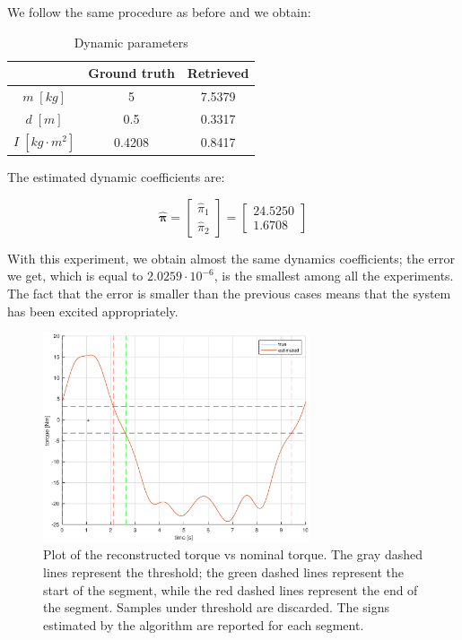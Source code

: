 \documentclass{article}
\begin{document}
We follow the same procedure as before and we obtain:

\begin{table}[!htbp]
\centering
\begin{tabular}{|c|cc|}
\hline
& Ground truth & Retrieved\\
\hline
$m\;[kg]$ & 5 & 7.5379\\ 
$d\;[m]$ & 0.5 & 0.3317\\
$I\;[kg\cdot m^2]$ & 0.4208 & 0.8417\\
\hline
\end{tabular}
\caption{Dynamic parameters}
\end{table}
\FloatBarrier

The estimated dynamic coefficients are:

\[\bm{\hat{\pi}}= \begin{bmatrix}
\hat{\pi}_1 \\\hat{ \pi}_2
\end{bmatrix} =
\begin{bmatrix}
24.5250 \\ 1.6708
\end{bmatrix}\]

With this experiment, we obtain almost the same dynamics coefficients; the error we get, which is equal to $2.0259\cdot10^{-6}$, is the smallest among all the experiments.  The fact that the error is smaller than the previous cases means that the system has been excited appropriately.

\begin{figure}[!htbp]
\centering
\includegraphics[width=0.7\textwidth]{images/1-dof/results3.eps}
\caption{Plot of the reconstructed torque vs nominal torque. The gray dashed lines represent the threshold; the green dashed lines represent the start of the segment, while the red dashed lines represent the end of the segment. Samples under threshold are discarded. The signs estimated by the algorithm are reported for each segment.}
\end{figure}
\FloatBarrier
\end{document}
